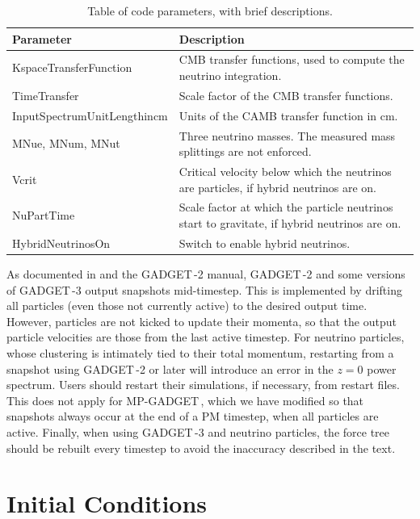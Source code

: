\documentclass[useAMS, usenatbib]{mnras}
\newcommand{\gadget}{{\small GADGET\,}}
\begin{document}
\begin{table}
\begin{center}
\begin{tabular}{|l|l|}
\hline
    Parameter & Description \\
\hline
KspaceTransferFunction   & CMB transfer functions, used to compute the neutrino integration. \\
TimeTransfer             & Scale factor of the CMB transfer functions. \\
InputSpectrumUnitLengthincm   & Units of the CAMB transfer function in cm. \\
MNue, MNum, MNut &  Three neutrino masses. The measured mass splittings are not enforced. \\
Vcrit            & Critical velocity below which the neutrinos are particles, if hybrid neutrinos are on. \\
NuPartTime       & Scale factor at which the particle neutrinos start to gravitate, if hybrid neutrinos are on. \\
HybridNeutrinosOn       & Switch to enable hybrid neutrinos. \\
\hline
\end{tabular}
\end{center}
\caption{Table of code parameters, with brief descriptions.}
\label{tab:parameters}
\end{table}

As documented in \cite{Springel_2005} and the \gadget-2 manual, \gadget-2 and some versions of \gadget-3 output snapshots mid-timestep. This is implemented by drifting all particles (even those not currently active) to the desired output time. However, particles are not kicked to update their momenta, so that the output particle velocities are those from the last active timestep. For neutrino particles, whose clustering is intimately tied to their total momentum, restarting from a snapshot using \gadget-2 or later will introduce an error in the $z=0$ power spectrum. Users should restart their simulations, if necessary, from restart files. This does not apply for MP-\gadget, which we have modified so that snapshots always occur at the end of a PM timestep, when all particles are active. Finally, when using \gadget-3 and neutrino particles, the force tree should be rebuilt every timestep to avoid the inaccuracy described in the text.


\section{Initial Conditions}
\label{sec:initcond}
\end{document}
